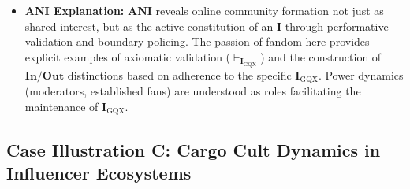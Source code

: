 \documentclass{article}
\newcommand{\ANI}{\textbf{ANI}}             %
\newcommand{\Isness}{\mathbf{I}}            %
\newcommand{\Inness}{\mathbf{In}}           %
\newcommand{\Outness}{\mathbf{Out}}         %
\newcommand{\validates}[1]{\ensuremath{\vdash_{#1}}} %
\begin{document}
\begin{itemize}
    \item \textbf{ANI Explanation:} \ANI{} reveals online community formation not just as shared interest, but as the active constitution of an $\Isness$ through performative validation and boundary policing. The passion of fandom here provides explicit examples of axiomatic validation ($\validates{\Isness_{\text{GQX}}}$) and the construction of $\Inness/\Outness$ distinctions based on adherence to the specific $\Isness_{\text{GQX}}$. Power dynamics (moderators, established fans) are understood as roles facilitating the maintenance of $\Isness_{\text{GQX}}$.
\end{itemize}

\subsection{Case Illustration C: Cargo Cult Dynamics in Influencer Ecosystems}
\end{document}
